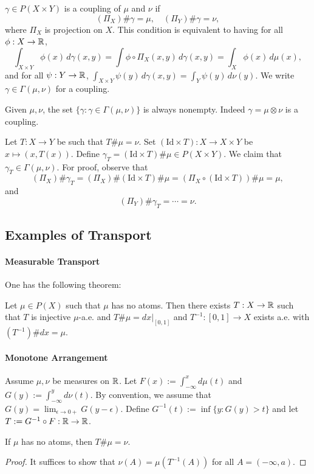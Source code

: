 \begin{definition}[Coupling]
    $\gamma \in P(X\times Y)$ is a coupling of $\mu$ and $\nu$ if 
    \[
        (\Pi_X)\# \gamma = \mu, \quad (\Pi_Y)\# \gamma = \nu,
    \] 
    where $\Pi_X$ is projection on $X$. This condition is equivalent to having for all $\phi:X\to\mathbb{R}$,
    \[
        \int_{X\times Y} \phi(x)\,d\gamma(x,y) = \int \phi \circ \Pi_X(x,y)\,d\gamma(x,y) = \int_X \phi(x)\,d\mu(x),
    \] 
    and for all $\psi:Y\to\mathbb{R}$, $\int_{X\times Y} \psi(y)\,d\gamma(x,y) = \int_Y \psi(y)\,d\nu(y)$.
    We write $\gamma \in \Gamma(\mu, \nu)$ for a coupling.
\end{definition}
\begin{remark}
    Given $\mu, \nu$, the set $\{\gamma : \gamma\in \Gamma(\mu, \nu)\}$ is always nonempty. Indeed $\gamma = \mu\otimes\nu$ is a coupling. 
\end{remark}

\begin{remark}
    Let $T:X\to Y$ be such that $T\#\mu = \nu$. Set $(\mathrm{Id}\times T): X\to X\times Y$ be $x\mapsto (x, T(x))$. Define $\gamma_T = (\mathrm{Id}\times T)\# \mu \in P(X\times Y)$. We claim that $\gamma_T \in \Gamma(\mu, \nu)$. For proof, observe that
    \[
        (\Pi_X)\#\gamma_T = (\Pi_X)\#(\mathrm{Id}\times T)\#\mu = (\Pi_X \circ (\mathrm{Id}\times T))\# \mu = \mu,
    \] 
    and
    \[
        (\Pi_Y)\#\gamma_T = \cdots = \nu.
    \] 
\end{remark}

\subsection{Examples of Transport}
\paragraph{Measurable Transport}
One has the following theorem:
\begin{theorem}
    Let $\mu \in P(X)$ such that $\mu$ has no atoms. Then there exists $T:X\to\mathbb{R}$ such that $T$ is injective $\mu$-a.e. and $T\#\mu = dx|_{[0,1]}$ and $T^{-1}:[0,1]\to X$ exists a.e. with $(T^{-1})\#dx = \mu$.
\end{theorem}

\paragraph{Monotone Arrangement} Assume $\mu, \nu$ be measures on $\mathbb{R}$. Let $F(x) := \int_{-\infty}^x d\mu(t)$ and $G(y) := \int_{-\infty}^y d\nu(t)$. By convention, we assume that $G(y) = \lim_{\epsilon \to 0+} G(y-\epsilon)$. Define $G^{-1}(t) := \inf \{y: G(y) > t\}$ and let $T := G^{-1}\circ F:\mathbb{R}\to \mathbb{R}$.

\begin{theorem}
    If $\mu$ has no atoms, then $T\#\mu = \nu$.
\end{theorem}
\begin{proof}
    It suffices to show that $\nu(A) = \mu(T^{-1}(A))$ for all $A=(-\infty, a)$. 
\end{proof}


